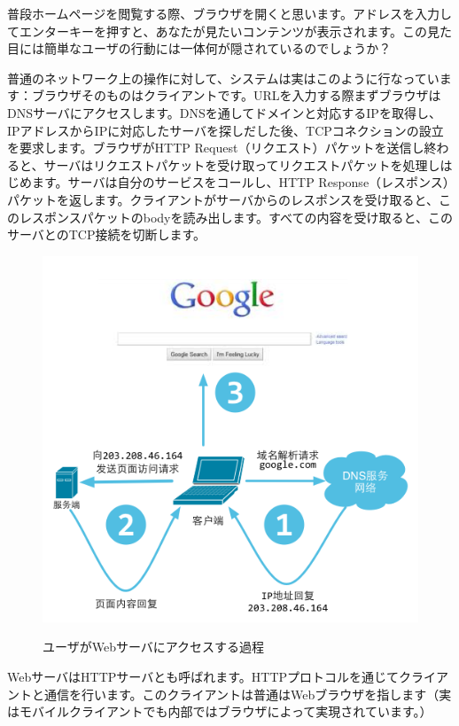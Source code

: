 普段ホームページを閲覧する際、ブラウザを開くと思います。アドレスを入力してエンターキーを押すと、あなたが見たいコンテンツが表示されます。この見た目には簡単なユーザの行動には一体何が隠されているのでしょうか？

普通のネットワーク上の操作に対して、システムは実はこのように行なっています：ブラウザそのものはクライアントです。URLを入力する際まずブラウザはDNSサーバにアクセスします。DNSを通してドメインと対応するIPを取得し、IPアドレスからIPに対応したサーバを探しだした後、TCPコネクションの設立を要求します。ブラウザがHTTP Request（リクエスト）パケットを送信し終わると、サーバはリクエストパケットを受け取ってリクエストパケットを処理しはじめます。サーバは自分のサービスをコールし、HTTP Response（レスポンス）パケットを返します。クライアントがサーバからのレスポンスを受け取ると、このレスポンスパケットのbodyを読み出します。すべての内容を受け取ると、このサーバとのTCP接続を切断します。


\begin{figure}[H]
  \includegraphics[width=14cm]{3.1.web2.png}
   \label{図3.1}
   \caption{ユーザがWebサーバにアクセスする過程}
\end{figure}


WebサーバはHTTPサーバとも呼ばれます。HTTPプロトコルを通じてクライアントと通信を行います。このクライアントは普通はWebブラウザを指します（実はモバイルクライアントでも内部ではブラウザによって実現されています。）

